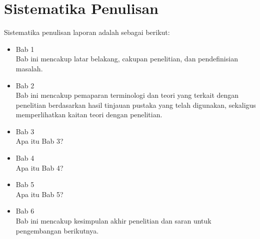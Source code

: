 \section{Sistematika Penulisan}
\label{sec:sistematikaPenulisan}
Sistematika penulisan laporan adalah sebagai berikut:
\begin{itemize}
	\item Bab 1 \babSatu \\
	    Bab ini mencakup latar belakang, cakupan penelitian, dan pendefinisian masalah.
	\item Bab 2 \babDua \\
	    Bab ini mencakup pemaparan terminologi dan teori yang terkait dengan penelitian berdasarkan hasil tinjauan pustaka yang telah digunakan, sekaligus memperlihatkan kaitan teori dengan penelitian.
	\item Bab 3 \babTiga \\
	    Apa itu Bab 3?
	\item Bab 4 \babEmpat \\
		Apa itu Bab 4?
	\item Bab 5 \babLima \\
	    Apa itu Bab 5?
	\item Bab 6 \kesimpulan \\
	    Bab ini mencakup kesimpulan akhir penelitian dan saran untuk pengembangan berikutnya.
\end{itemize}

